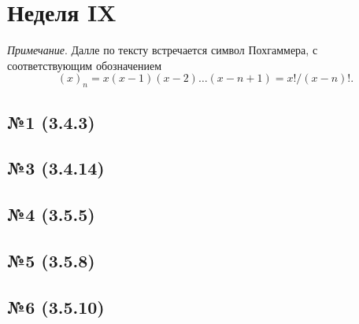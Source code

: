 \section{Неделя IX}

\textit{Примечание}. Далле по тексту встречается символ Похгаммера, с соответствующим обозначением
\begin{equation*}
    (x)_n = x (x-1) (x-2) \ldots (x-n+ 1) = x!/(x-n)!.
\end{equation*}

\subsection*{№1 (3.4.3)}


% 

\subsection*{№3 (3.4.14)}


\subsection*{№4 (3.5.5)}


\subsection*{№5 (3.5.8)}


\subsection*{№6 (3.5.10)} %
